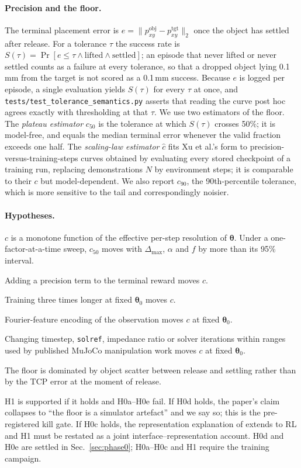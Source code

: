 \documentclass{article}
\newcommand{\dmax}{\Delta_{\max}}
\newcommand{\iface}{\boldsymbol{\theta}}
\begin{document}
\paragraph{Precision and the floor.}
The terminal placement error is $e = \|p^{\mathrm{obj}}_{xy} - p^{\mathrm{tgt}}_{xy}\|_2$
once the object has settled after release. For a tolerance $\tau$ the success
rate is $S(\tau) = \Pr[e \le \tau \wedge \text{lifted} \wedge \text{settled}]$;
an episode that never lifted or never settled counts as a failure at every
tolerance, so that a dropped object lying 0.1\,mm from the target is not scored
as a 0.1\,mm success. Because $e$ is logged per episode, a single evaluation
yields $S(\tau)$ for every $\tau$ at once, and
\texttt{tests/test\_tolerance\_semantics.py} asserts that reading the curve post
hoc agrees exactly with thresholding at that $\tau$. We use two estimators of
the floor. The \emph{plateau estimator} $c_{50}$ is the tolerance at which
$S(\tau)$ crosses 50\%; it is model-free, and equals the median terminal error
whenever the valid fraction exceeds one half. The \emph{scaling-law estimator}
$\hat c$ fits Xu et al.'s form to precision-versus-training-steps curves
obtained by evaluating every stored checkpoint of a training run, replacing
demonstrations $N$ by environment steps; it is comparable to their $c$ but
model-dependent. We also report $c_{90}$, the 90th-percentile tolerance, which
is more sensitive to the tail and correspondingly noisier.

\paragraph{Hypotheses.}
\begin{description}[nosep,leftmargin=1.5em]
\item[H1 (interface).] $c$ is a monotone function of the effective per-step
resolution of $\iface$. Under a one-factor-at-a-time sweep, $c_{50}$ moves with
$\dmax$, $\alpha$ and $f$ by more than its 95\% interval.
\item[H0a (reward).] Adding a precision term to the terminal reward moves $c$.
\item[H0b (budget).] Training three times longer at fixed $\iface_0$ moves $c$.
\item[H0c (representation).] Fourier-feature encoding of the observation moves
$c$ at fixed $\iface_0$.
\item[H0d (simulator).] Changing timestep, \texttt{solref}, impedance ratio or
solver iterations within ranges used by published MuJoCo manipulation work
moves $c$ at fixed $\iface_0$.
\item[H0e (release physics).] The floor is dominated by object scatter between
release and settling rather than by the TCP error at the moment of release.
\end{description}
H1 is supported if it holds and H0a--H0e fail. If H0d holds, the paper's claim
collapses to ``the floor is a simulator artefact'' and we say so; this is the
pre-registered kill gate. If H0c holds, the representation explanation of
\citet{gyenes2026fourier} extends to RL and H1 must be restated as a joint
interface--representation account. H0d and H0e are settled in
Sec.~\ref{sec:phase0}; H0a--H0c and H1 require the training campaign.
\end{document}
